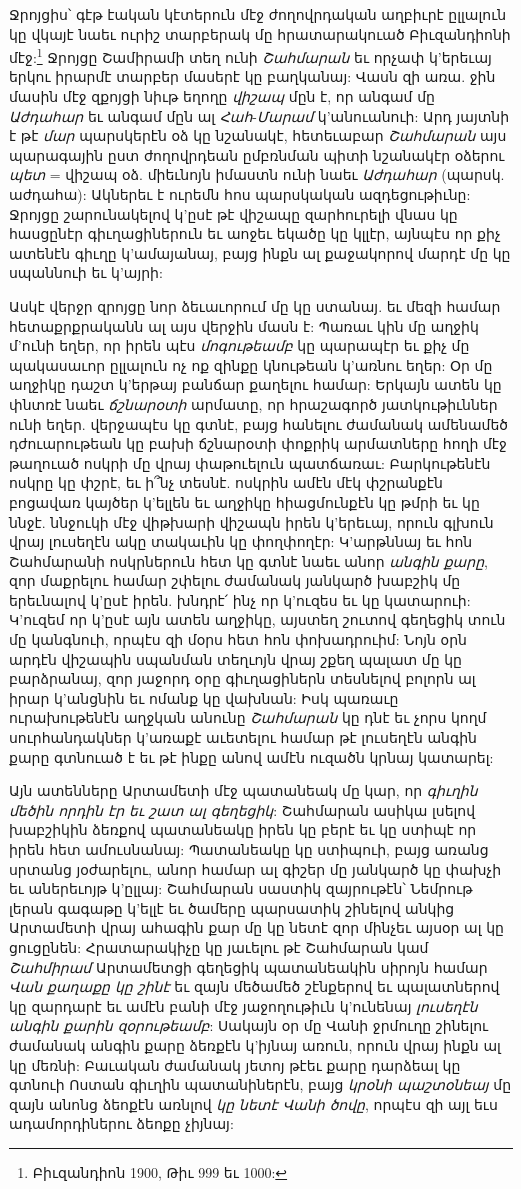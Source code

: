 \documentclass{article}
\begin{document}
{Ջրոյցիս՝ գէթ էական կէտերուն մէջ ժողովրդական աղբիւրէ ըլլալուն կը վկայէ նաեւ ուրիշ տարբերակ մը հրատարակուած Բիւզանդիոնի մէջ:\footnote{Բիւզանդիոն 1900, Թիւ 999 եւ 1000:} Ջրոյցը Շամիրամի տեղ ունի \emph{Շահմարան} եւ որչափ կ'երեւայ երկու իրարմէ տարբեր մասերէ կը բաղկանայ: Վասն զի առա. ջին մասին մէջ զքոյցի նիւթ եղողը \emph{վիշապ} մըն է, որ անգամ մը \emph{Աժդահար} եւ անգամ մըն ալ \emph{Հահ}-\emph{Մարամ} կ'անուանուի: Արդ յայտնի է թէ \emph{մար} պարսկերէն օձ կը նշանակէ, հետեւաբար \emph{Շահմարան} այս պարագային ըստ ժողովրդեան ըմբռնման պիտի նշանակէր օձերու \emph{պետ} = վիշապ օձ. միեւնոյն իմաստն ունի նաեւ \emph{Աժդահար} (պարսկ. աժդահա): Ակներեւ է ուրեմն հոս պարսկական ազդեցութիւնը: Ջրոյցը շարունակելով կ'ըսէ թէ վիշապը զարհուրելի վնաս կը հասցընէր գիւղացիներուն եւ աոջեւ եկածը կը կլլէր, այնպէս որ քիչ ատենէն գիւղը կ'ամայանայ, բայց ինքն ալ քաջակորով մարդէ մը կը սպաննուի եւ կ'այրի:

Ասկէ վերջր զրոյցը նոր ձեւաւորում մը կը ստանայ. եւ մեզի համար հետաքրքրականն ալ այս վերջին մասն է: Պառաւ կին մը աղջիկ մ'ունի եղեր, որ իրեն պէս \emph{մոգութեամբ} կը պարապէր եւ քիչ մը պակասաւոր ըլլալուն ոչ ոք զինքը կնութեան կ'առնու եղեր: Օր մը աղջիկը դաշտ կ'երթայ բանճար քաղելու համար: Երկայն ատեն կը փնտռէ նաեւ \emph{ճշնարօտի} արմատը, որ հրաշագործ յատկութիւններ ունի եղեր. վերջապէս կը գտնէ, բայց հանելու ժամանակ ամենամեծ դժուարութեան կը բախի ճշնարօտի փոքրիկ արմատները հողի մէջ թաղուած ոսկրի մը վրայ փաթուելուն պատճառաւ: Բարկութենէն ոսկրը կը փշրէ, եւ ի՞նչ տեսնէ. ոսկրին ամէն մէկ փշրանքէն բոցավառ կայծեր կ'ելլեն եւ աղջիկը հիացմունքէն կը թմրի եւ կը ննջէ. ննջուկի մէջ վիթխարի վիշապն իրեն կ'երեւայ, որուն գլխուն վրայ լուսեղէն ակը տակաւին կը փողփողէր: Կ'արթննայ եւ հոն Շահմարանի ոսկրներուն հետ կը գտնէ նաեւ անոր \emph{անգին քարը}, զոր մաքրելու համար շփելու ժամանակ յանկարծ խաբշիկ մը երեւնալով կ'ըսէ իրեն. խնդրէ՛ ինչ որ կ'ուզես եւ կը կատարուի: Կ'ուզեմ որ կ'ըսէ այն ատեն աղջիկը, այստեղ շուտով գեղեցիկ տուն մը կանգնուի, որպէս զի մօրս հետ հոն փոխադրուիմ: Նոյն օրն արդէն վիշապին սպանման տեղւոյն վրայ շքեղ պալատ մը կը բարձրանայ, զոր յաջորդ օրը գիւղացիներն տեսնելով բոլորն ալ իրար կ'անցնին եւ ոմանք կը վախնան: Իսկ պառաւը ուրախութենէն աղջկան անունը \emph{Շահմարան} կը դնէ եւ չորս կողմ սուրհանդակներ կ'առաքէ աւետելու համար թէ լուսեղէն անգին քարը գտնուած է եւ թէ ինքը անով ամէն ուզածն կրնայ կատարել:

Այն ատենները Արտամետի մէջ պատանեակ մը կար, որ \emph{գիւղին մեծին որդին էր եւ շատ ալ գեղեցիկ}: Շահմարան ասիկա լսելով խաբշիկին ձեռքով պատանեակը իրեն կը բերէ եւ կը ստիպէ որ իրեն հետ ամուսնանայ: Պատանեակը կը ստիպուի, բայց առանց սրտանց յօժարելու, անոր համար ալ գիշեր մը յանկարծ կը փախչի եւ աներեւոյթ կ'ըլլայ: Շահմարան սաստիկ զայրութէն՝ Նեմրութ լերան գագաթը կ'ելլէ եւ ծամերը պարսատիկ շինելով անկից Արտամետի վրայ ահագին քար մը կը նետէ զոր մինչեւ այսօր ալ կը ցուցընեն: Հրատարակիչը կը յաւելու թէ Շահմարան կամ \emph{Շահմիրամ} Արտամետցի գեղեցիկ պատանեակին սիրոյն համար \emph{Վան քաղաքը կը շինէ} եւ զայն մեծամեծ շէնքերով եւ պալատներով կը զարդարէ եւ ամէն բանի մէջ յաջողութիւն կ'ունենայ \emph{լուսեղէն անգին քարին զօրութեամբ}: Սակայն օր մը Վանի ջրմուղը շինելու ժամանակ անգին քարը ձեռքէն կ'իյնայ առուն, որուն վրայ ինքն ալ կը մեռնի: Բաւական ժամանակ յետոյ թէեւ քարը դարձեալ կը գտնուի Ոստան գիւղին պատանիներէն, բայց \emph{կրօնի պաշտօնեայ} մը զայն անոնց ձեոքէն առնլով \emph{կը նետէ Վանի ծովը}, որպէս զի այլ եւս ադամորդիներու ձեոքը չիյնայ:

}
\end{document}
